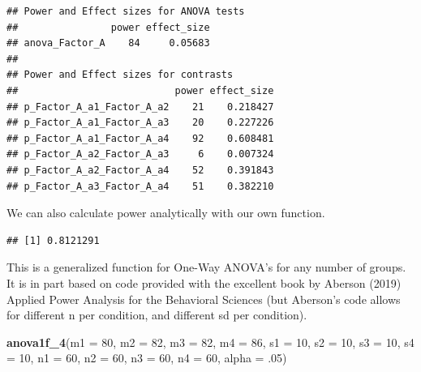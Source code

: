 \documentclass[]{book}
\newenvironment{Shaded}{\begin{snugshade}}{\end{snugshade}}
\newcommand{\CommentTok}[1]{\textcolor[rgb]{0.56,0.35,0.01}{\textit{#1}}}
\newcommand{\DataTypeTok}[1]{\textcolor[rgb]{0.13,0.29,0.53}{#1}}
\newcommand{\DecValTok}[1]{\textcolor[rgb]{0.00,0.00,0.81}{#1}}
\newcommand{\FloatTok}[1]{\textcolor[rgb]{0.00,0.00,0.81}{#1}}
\newcommand{\KeywordTok}[1]{\textcolor[rgb]{0.13,0.29,0.53}{\textbf{#1}}}
\newcommand{\NormalTok}[1]{#1}
\newcommand{\OperatorTok}[1]{\textcolor[rgb]{0.81,0.36,0.00}{\textbf{#1}}}
\begin{document}
\begin{verbatim}
## Power and Effect sizes for ANOVA tests
##                power effect_size
## anova_Factor_A    84     0.05683
## 
## Power and Effect sizes for contrasts
##                           power effect_size
## p_Factor_A_a1_Factor_A_a2    21    0.218427
## p_Factor_A_a1_Factor_A_a3    20    0.227226
## p_Factor_A_a1_Factor_A_a4    92    0.608481
## p_Factor_A_a2_Factor_A_a3     6    0.007324
## p_Factor_A_a2_Factor_A_a4    52    0.391843
## p_Factor_A_a3_Factor_A_a4    51    0.382210
\end{verbatim}

We can also calculate power analytically with our own function.

\begin{Shaded}
\end{Shaded}

\begin{verbatim}
## [1] 0.8121291
\end{verbatim}

This is a generalized function for One-Way ANOVA's for any number of groups. It is in part based on code provided with the excellent book by Aberson (2019) Applied Power Analysis for the Behavioral Sciences (but Aberson's code allows for different n per condition, and different sd per condition).

\begin{Shaded}
\begin{Highlighting}[]
\KeywordTok{anova1f_4}\NormalTok{(}\DataTypeTok{m1 =} \DecValTok{80}\NormalTok{, }\DataTypeTok{m2 =} \DecValTok{82}\NormalTok{, }\DataTypeTok{m3 =} \DecValTok{82}\NormalTok{, }\DataTypeTok{m4 =} \DecValTok{86}\NormalTok{,}
          \DataTypeTok{s1 =} \DecValTok{10}\NormalTok{, }\DataTypeTok{s2 =} \DecValTok{10}\NormalTok{, }\DataTypeTok{s3 =} \DecValTok{10}\NormalTok{, }\DataTypeTok{s4 =} \DecValTok{10}\NormalTok{,}
          \DataTypeTok{n1 =} \DecValTok{60}\NormalTok{, }\DataTypeTok{n2 =} \DecValTok{60}\NormalTok{, }\DataTypeTok{n3 =} \DecValTok{60}\NormalTok{, }\DataTypeTok{n4 =} \DecValTok{60}\NormalTok{,}
          \DataTypeTok{alpha =} \FloatTok{.05}\NormalTok{)}
\end{Highlighting}
\end{Shaded}
\end{document}
